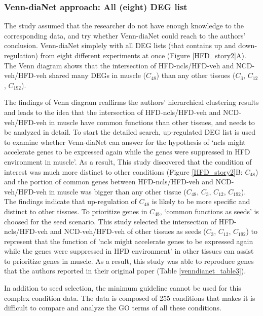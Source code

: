 \documentclass[oneside,phd]{snuthesis}
\begin{document}
\subsubsection{Venn-diaNet approach: All (eight) DEG list} 
The study assumed that the researcher do not have enough knowledge to the corresponding data, and try whether Venn-diaNet could reach to the authors' conclusion. 
Venn-diaNet simplely with all DEG lists (that contains up and down-regulation) from eight different experiments at once (Figure \ref{HFD_story2}A). 
The Venn diagram shows that the intersection of HFD-ncls/HFD-veh and NCD-veh/HFD-veh shared many DEGs in muscle ($C_{48}$) than any other tissues ($C_3$, $C_{12}$, $C_{192}$).

The findings of Venn diagram reaffirms the authors' hierarchical clustering results and leads to the idea that the intersection of HFD-ncls/HFD-veh and NCD-veh/HFD-veh in muscle have common functions than other tissues, and needs to be analyzed in detail. 
To start the detailed search, up-regulated DEG list is used to examine whether Venn-diaNet can answer for the hypothesis of `ncls might accelerate genes to be expressed again while the genes were suppressed in HFD environment in muscle'. 
As a result, This study discovered that the condition of interest was much more distinct to other conditions (Figure \ref{HFD_story2}B: $C_{48}$) and the portion of common genes between HFD-ncls/HFD-veh and NCD-veh/HFD-veh in muscle was bigger than any other tissue ($C_{48}$, $C_3$, $C_{12}$, $C_{192}$).
The findings indicate that up-regulation of $C_{48}$ is likely to be more specific and distinct to other tissues. 
To prioritize genes in $C_{48}$, `common functions as seeds' is choosed for the seed scenario. 
This study selected the intersection of HFD-ncls/HFD-veh and NCD-veh/HFD-veh of other tissues as seeds ($C_3$, $C_{12}$, $C_{192}$) to represent that the function of 'ncls might accelerate genes to be expressed again while the genes were suppressed in HFD environment' in other tissues can assist to prioritize genes in muscle. 
As a result, this study was able to reproduce genes that the authors reported in their original paper (Table \ref{venndianet_table3}).

In addition to seed selection, the minimum guideline cannot be used for this complex condition data. 
The data is composed of 255 conditions that makes it is difficult to compare and analyze the GO terms of all these conditions.
\end{document}
